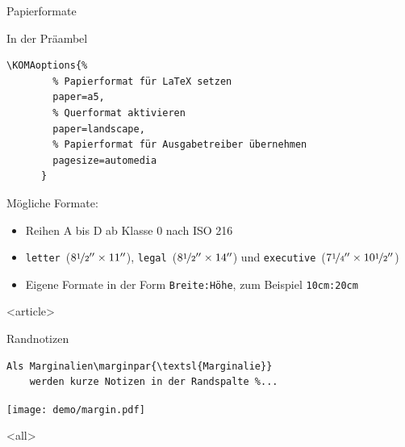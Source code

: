 \begin{Frame}[fragile]{Papierformate}
  \begin{Block}{In der Präambel}
    \begin{lstlisting}[gobble=6,style=block]
      \KOMAoptions{%
        % Papierformat für LaTeX setzen
        paper=a5,
        % Querformat aktivieren
        paper=landscape,
        % Papierformat für Ausgabetreiber übernehmen
        pagesize=automedia
      }
    \end{lstlisting}
  \end{Block}

  \xxx

  Mögliche Formate:
  \begin{itemize}
    \item Reihen A bis D ab Klasse 0 nach ISO 216
    \item \lstinline[language={}]-letter-~($8\nicefrac12'' \times 11''$),
      \lstinline-legal-~($8\nicefrac12'' \times 14''$) und
      \lstinline-executive-~($7\nicefrac14'' \times 10\nicefrac12''$)
    \item Eigene Formate in der Form \lstinline-Breite:Höhe-,\newline
      zum Beispiel \lstinline-10cm:20cm-
  \end{itemize}
\end{Frame}

\mode
<article>

\begin{Block}{Randnotizen}
  \begin{lstlisting}[gobble=4]
    Als Marginalien\marginpar{\textsl{Marginalie}}
    werden kurze Notizen in der Randspalte %...
  \end{lstlisting}

  \begin{center}
    \texttt{[image: demo/margin.pdf]}
  \end{center}
\end{Block}

\mode
<all>

